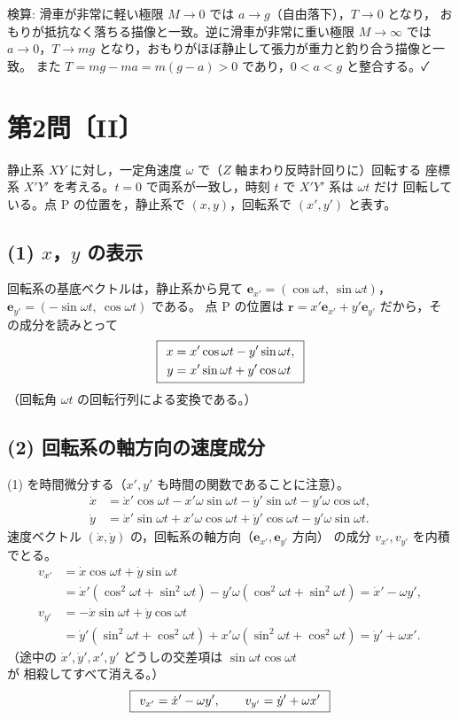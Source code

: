 \documentclass[11pt,a4paper]{article}
\begin{document}
\medskip
検算: 滑車が非常に軽い極限 $M\to0$ では $a\to g$（自由落下），$T\to0$ となり，
おもりが抵抗なく落ちる描像と一致。逆に滑車が非常に重い極限 $M\to\infty$ では
$a\to0$，$T\to mg$ となり，おもりがほぼ静止して張力が重力と釣り合う描像と一致。
また $T=mg-ma=m(g-a)>0$ であり，$0<a<g$ と整合する。✓

\clearpage
\section*{第2問〔II〕}

静止系 $XY$ に対し，一定角速度 $\omega$ で（$Z$ 軸まわり反時計回りに）回転する
座標系 $X'Y'$ を考える。$t=0$ で両系が一致し，時刻 $t$ で $X'Y'$ 系は $\omega t$ だけ
回転している。点 P の位置を，静止系で $(x,y)$，回転系で $(x',y')$ と表す。

\subsection*{(1) $x$，$y$ の表示}
回転系の基底ベクトルは，静止系から見て
$\bm{e}_{x'}=(\cos\omega t,\ \sin\omega t)$，
$\bm{e}_{y'}=(-\sin\omega t,\ \cos\omega t)$ である。
点 P の位置は $\bm{r}=x'\bm{e}_{x'}+y'\bm{e}_{y'}$ だから，その成分を読みとって
\[
  \boxed{\,\;
  \begin{aligned}
    x &= x'\cos\omega t - y'\sin\omega t,\\
    y &= x'\sin\omega t + y'\cos\omega t
  \end{aligned}\;\,}
\]
（回転角 $\omega t$ の回転行列による変換である。）

\subsection*{(2) 回転系の軸方向の速度成分}
(1) を時間微分する（$x',y'$ も時間の関数であることに注意）。
\begin{align*}
  \dot{x} &= \dot{x}'\cos\omega t - x'\omega\sin\omega t
             - \dot{y}'\sin\omega t - y'\omega\cos\omega t,\\
  \dot{y} &= \dot{x}'\sin\omega t + x'\omega\cos\omega t
             + \dot{y}'\cos\omega t - y'\omega\sin\omega t.
\end{align*}
速度ベクトル $(\dot{x},\dot{y})$ の，回転系の軸方向（$\bm{e}_{x'},\bm{e}_{y'}$ 方向）
の成分 $v_{x'},v_{y'}$ を内積でとる。
\begin{align*}
  v_{x'} &= \dot{x}\cos\omega t + \dot{y}\sin\omega t\\
         &= \dot{x}'(\cos^2\omega t+\sin^2\omega t)
            - y'\omega(\cos^2\omega t+\sin^2\omega t)
          = \dot{x}' - \omega y',\\
  v_{y'} &= -\dot{x}\sin\omega t + \dot{y}\cos\omega t\\
         &= \dot{y}'(\sin^2\omega t+\cos^2\omega t)
            + x'\omega(\sin^2\omega t+\cos^2\omega t)
          = \dot{y}' + \omega x'.
\end{align*}
（途中の $\dot{x}',\dot{y}',x',y'$ どうしの交差項は $\sin\omega t\cos\omega t$ が
相殺してすべて消える。）
\[
  \boxed{\,\;
  v_{x'} = \dot{x}' - \omega y',\qquad
  v_{y'} = \dot{y}' + \omega x'\;\,}
\]
\end{document}
